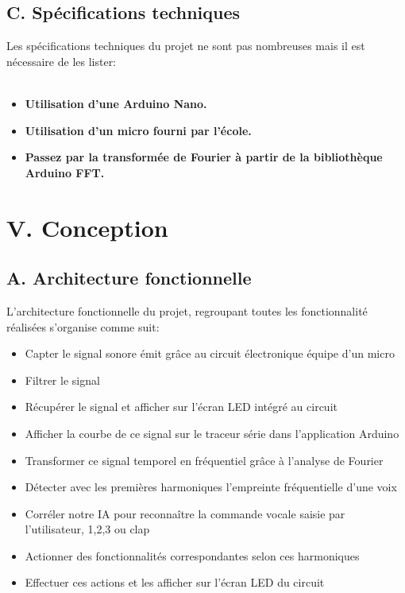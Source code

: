 \documentclass[a4paper,11pt]{book}
\begin{document}
\subsection*{C. Spécifications techniques}
Les spécifications techniques du projet ne sont pas nombreuses mais il est nécessaire de les lister: \\ \\
\begin{itemize}
        \item \textbf{Utilisation d'une Arduino Nano.}
        \item \textbf{Utilisation d'un micro fourni par l'école.}
        \item \textbf{Passez par la transformée de Fourier à partir de la bibliothèque Arduino FFT.} 
\end{itemize}
\vspace{2mm}

\newpage
\section*{V. Conception}
\subsection*{A. Architecture fonctionnelle}
L'architecture fonctionnelle du projet, regroupant toutes les fonctionnalité réalisées s'organise comme suit: 
\begin{itemize}
        \item Capter le signal sonore émit grâce au circuit électronique équipe d'un micro
\indent \item Filtrer le signal
\indent \item Récupérer le signal et afficher sur l'écran LED intégré au circuit 
\indent \item Afficher la courbe de ce signal sur le traceur série dans l'application Arduino 
\indent \item Transformer ce signal temporel en fréquentiel grâce à l'analyse de Fourier 
\indent \item Détecter avec les premières harmoniques l'empreinte fréquentielle d'une voix
\indent \item Corréler notre IA pour reconnaître la commande vocale saisie par l'utilisateur, 1,2,3 ou clap 
\indent \item Actionner des fonctionnalités correspondantes selon ces harmoniques 
\indent \item Effectuer ces actions et les afficher sur l'écran LED du circuit 
\end{itemize}
\end{document}
